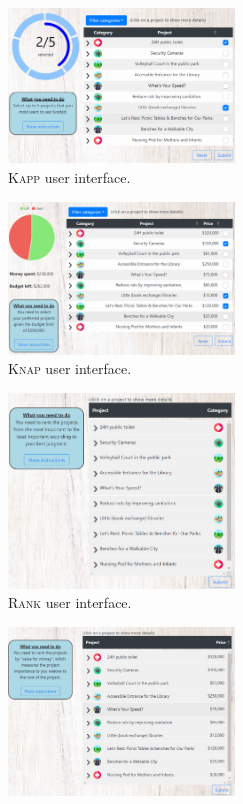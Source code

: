 \documentclass{comsoc2023}
\newcommand{\rank}{\textsc{Rank}}
\newcommand{\knap}{\textsc{Knap}}
\newcommand{\kapp}{\textsc{Kapp}}
\begin{document}
\begin{figure}[ht!]
     \centering
          \begin{subfigure}[b]{0.45\textwidth}
         \centering
       \includegraphics[width=6cm]{experiment/k approval.PNG}
\caption{\kapp{} user interface.
}\label{fig:kapp_inter}
     \end{subfigure}\hfill
     \begin{subfigure}[b]{0.45\textwidth}
         \centering
         \includegraphics[width=6cm]{experiment/knapsack.PNG}
\caption{\knap{}  user interface.
}\label{fig:knap_welfare_app}
     \end{subfigure}
     \hfill
     \begin{subfigure}[b]{0.45\textwidth}
         \centering
         \includegraphics[width=6cm]{experiment/ranking.PNG}
\caption{\rank{} user interface.
}\label{fig:rank_inter}
     \end{subfigure}
     \hfill
     \begin{subfigure}[b]{0.45\textwidth}
         \centering
\includegraphics[width=6cm]{experiment/ranking by cost.PNG}

\end{subfigure}
\end{figure}
\end{document}
